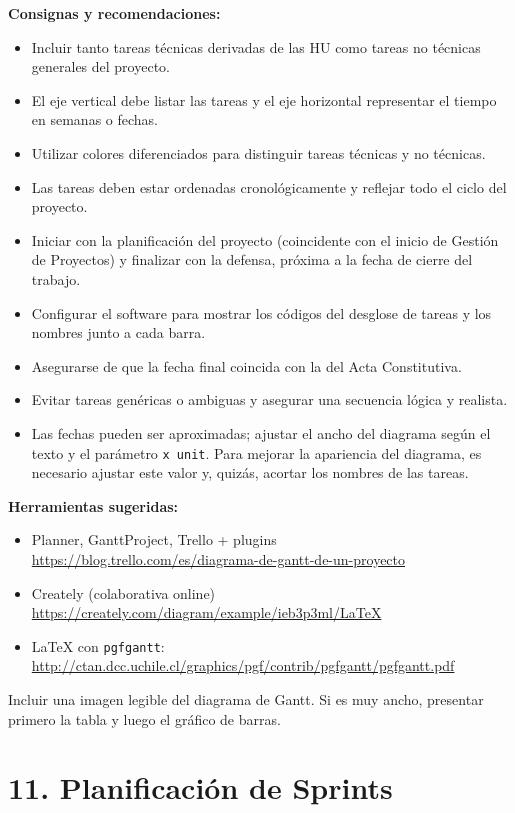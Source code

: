 \documentclass[
11pt, %
]{ProyectoVpC}
\begin{document}
\textbf{Consignas y recomendaciones:}
\begin{itemize}
  \item Incluir tanto tareas técnicas derivadas de las HU como tareas no técnicas generales del proyecto.
  \item El eje vertical debe listar las tareas y el eje horizontal representar el tiempo en semanas o fechas.
  \item Utilizar colores diferenciados para distinguir tareas técnicas y no técnicas.
  \item Las tareas deben estar ordenadas cronológicamente y reflejar todo el ciclo del proyecto.
  \item Iniciar con la planificación del proyecto (coincidente con el inicio de Gestión de Proyectos) y finalizar con la defensa, próxima a la fecha de cierre del trabajo.
  \item Configurar el software para mostrar los códigos del desglose de tareas y los nombres junto a cada barra.
  \item Asegurarse de que la fecha final coincida con la del Acta Constitutiva.
  \item Evitar tareas genéricas o ambiguas y asegurar una secuencia lógica y realista.
  \item Las fechas pueden ser aproximadas; ajustar el ancho del diagrama según el texto y el parámetro \texttt{x unit}. Para mejorar la apariencia del diagrama, es necesario ajustar este valor y, quizás, acortar los nombres de las tareas.
\end{itemize}

\textbf{Herramientas sugeridas:}
\begin{itemize}
  \item Planner, GanttProject, Trello + plugins\\
  \url{https://blog.trello.com/es/diagrama-de-gantt-de-un-proyecto}
  \item Creately (colaborativa online)\\
  \url{https://creately.com/diagram/example/ieb3p3ml/LaTeX}
  \item LaTeX con \texttt{pgfgantt}:\\
  \url{http://ctan.dcc.uchile.cl/graphics/pgf/contrib/pgfgantt/pgfgantt.pdf}
\end{itemize}

Incluir una imagen legible del diagrama de Gantt. Si es muy ancho, presentar primero la tabla y luego el gráfico de barras.

\section{11. Planificación de Sprints}
\end{document}

